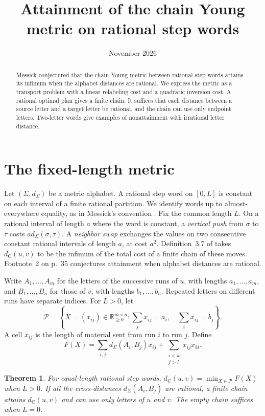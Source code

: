 \documentclass[11pt,a4paper]{amsart}
\title{Attainment of the chain Young metric on rational step words}
\date{November 2026}
\newtheorem{theorem}{Theorem}
\newcommand{\dd}{d_\Sigma}
\newcommand{\dc}{d_{\mathrm C}}
\begin{document}
\begin{abstract}
Messick conjectured that the chain Young metric between rational step words attains its infimum when the alphabet distances are rational. We express the metric as a transport problem with a linear relabeling cost and a quadratic inversion cost. A rational optimal plan gives a finite chain. It suffices that each distance between a source letter and a target letter be rational, and the chain can use only endpoint letters. Two-letter words give examples of nonattainment with irrational letter distance.
\end{abstract}
\maketitle

\section{The fixed-length metric}

Let \((\Sigma,\dd)\) be a metric alphabet. A rational step word on \([0,L]\) is constant on each interval of a finite rational partition. We identify words up to almost-everywhere equality, as in Messick's convention \cite[p.~30]{messick}. Fix the common length \(L\). On a rational interval of length \(a\) where the word is constant, a \emph{vertical push} from \(\sigma\) to \(\tau\) costs \(a\dd(\sigma,\tau)\). A \emph{neighbor swap} exchanges the values on two consecutive constant rational intervals of length \(a\), at cost \(a^2\). Definition~3.7 of \cite{messick} takes \(\dc(u,v)\) to be the infimum of the total cost of a finite chain of these moves. Footnote~2 on p.~35 conjectures attainment when alphabet distances are rational.

Write \(A_1,\ldots,A_m\) for the letters of the successive runs of \(u\), with lengths \(a_1,\ldots,a_m\), and \(B_1,\ldots,B_n\) for those of \(v\), with lengths \(b_1,\ldots,b_n\). Repeated letters on different runs have separate indices. For \(L>0\), let
\[
\mathcal P=\left\{X=(x_{ij})\in\mathbb R_{\ge 0}^{m\times n}:
   \sum_j x_{ij}=a_i,\quad\sum_i x_{ij}=b_j\right\}.
\]
A cell \(x_{ij}\) is the length of material sent from run \(i\) to run \(j\). Define
\[
F(X)=\sum_{i,j}\dd(A_i,B_j)x_{ij}
       +\sum_{\substack{i<k\\ j>l}} x_{ij}x_{kl}.
\]

\begin{theorem}\label{thm:main}
For equal-length rational step words, \(\dc(u,v)=\min_{X\in\mathcal P}F(X)\) when \(L>0\). If all the cross-distances \(\dd(A_i,B_j)\) are rational, a finite chain attains \(\dc(u,v)\) and can use only letters of \(u\) and \(v\). The empty chain suffices when \(L=0\).
\end{theorem}
\end{document}
